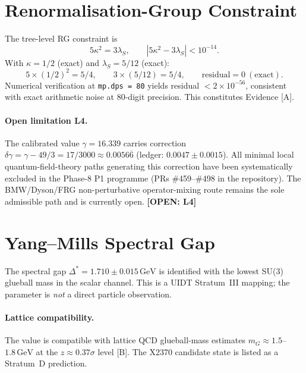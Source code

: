 \documentclass[12pt,a4paper]{article}
\newcommand{\UIDT}{\textsc{UIDT}}
\newcommand{\kap}{\kappa}
\newcommand{\lams}{\lambda_S}
\newcommand{\gam}{\gamma}
\newcommand{\Dstar}{\Delta^*}
\newcommand{\openitem}[1]{\textbf{[OPEN: #1]}}
\begin{document}
\section{Renormalisation-Group Constraint}
\label{sec:rg}

The tree-level RG constraint is
\begin{equation}
  5\kap^2 = 3\lams, \qquad
  \left|5\kap^2 - 3\lams\right| < 10^{-14}.
  \label{eq:rg_constraint}
\end{equation}
With $\kap = 1/2$ (exact) and $\lams = 5/12$ (exact):
\begin{equation}
  5 \times (1/2)^2 = 5/4, \qquad
  3 \times (5/12) = 5/4, \qquad
  \text{residual} = 0\ (\text{exact}).
\end{equation}
Numerical verification at \texttt{mp.dps\,=\,80} yields residual
$< 2 \times 10^{-56}$, consistent with exact arithmetic noise at 80-digit
precision. This constitutes Evidence [A].

\paragraph{Open limitation L4.}
The calibrated value $\gam = 16.339$ carries correction
$\delta\gam = \gam - 49/3 = 17/3000 \approx 0.0056\overline{6}$
(ledger: $0.0047 \pm 0.0015$).
All minimal local quantum-field-theory paths generating this correction
have been systematically excluded in the Phase-8 P1 programme
(PRs \#459--\#498 in the repository).
The BMW/Dyson/FRG non-perturbative operator-mixing route remains the
sole admissible path and is currently open.
\openitem{L4}

\section{Yang--Mills Spectral Gap}
\label{sec:gap}

The spectral gap $\Dstar = 1.710 \pm 0.015\,\text{GeV}$ is identified with
the lowest SU(3) glueball mass in the scalar channel.
This is a \UIDT{} Stratum~III mapping; the parameter is \emph{not} a direct
particle observation.

\paragraph{Lattice compatibility.}
The value is compatible with lattice QCD glueball-mass estimates
$m_G \approx 1.5$--$1.8\,\text{GeV}$ at the $z \approx 0.37\sigma$ level [B].
The X2370 candidate state is listed as a Stratum~D prediction.
\end{document}
